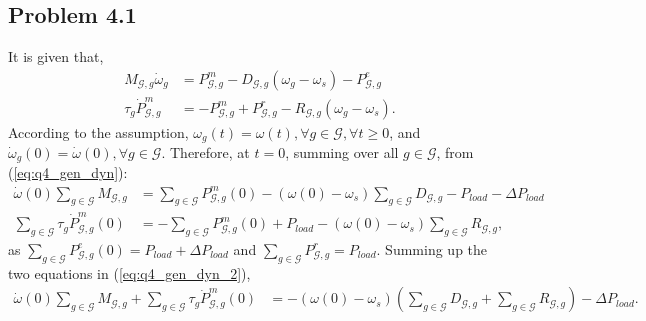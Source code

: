 \subsection*{Problem 4.1}
It is given that,
\begin{align}\label{eq:q4_gen_dyn}
	M_{\mathcal{G},g}\dot{\omega}_g &= P_{\mathcal{G},g}^m -D_{\mathcal{G},g}(\omega_g-\omega_s)-P_{\mathcal{G},g}^e \nonumber\\
	\tau_g\dot{P}_{\mathcal{G},g}^m &= -P_{\mathcal{G},g}^m + P_{\mathcal{G},g}^r - R_{\mathcal{G},g}(\omega_g-\omega_s).
\end{align}
According to the assumption, $\omega_g(t)=\omega(t), \forall g \in \mathcal{G}, \forall t \geq 0$, and $\dot{\omega}_g(0) = \dot{\omega}(0), \forall g \in \mathcal{G}$. Therefore, at $t=0$, summing over all $g \in \mathcal{G}$, from (\ref{eq:q4_gen_dyn}):
\begin{align}\label{eq:q4_gen_dyn_2}
	\dot{\omega}(0)\sum_{g\in \mathcal{G}}M_{\mathcal{G},g} &= \sum_{g\in \mathcal{G}}P_{\mathcal{G},g}^m(0) - (\omega(0)-\omega_s)\sum_{g\in \mathcal{G}}D_{\mathcal{G},g}-P_{load}-\Delta P_{load}\\
	\sum_{g\in \mathcal{G}}\tau_g \dot{P}_{\mathcal{G},g}^m(0) &= -\sum_{g\in \mathcal{G}}P_{\mathcal{G},g}^m(0) + P_{load} - (\omega(0)-\omega_s)\sum_{g\in \mathcal{G}}R_{\mathcal{G},g},
\end{align}
as $\sum_{g\in \mathcal{G}}P_{\mathcal{G},g}^e(0) = P_{load}+\Delta P_{load}$ and $\sum_{g\in \mathcal{G}}P_{\mathcal{G},g}^r = P_{load}$. Summing up the two equations in (\ref{eq:q4_gen_dyn_2}),
\begin{align*}
	\dot{\omega}(0)\sum_{g\in \mathcal{G}}M_{\mathcal{G},g} + \sum_{g\in \mathcal{G}}\tau_g \dot{P}_{\mathcal{G},g}^m(0) &= - (\omega(0)-\omega_s)\left(\sum_{g\in \mathcal{G}}D_{\mathcal{G},g} + \sum_{g\in \mathcal{G}}R_{\mathcal{G},g}\right)-\Delta P_{load}.
\end{align*}
